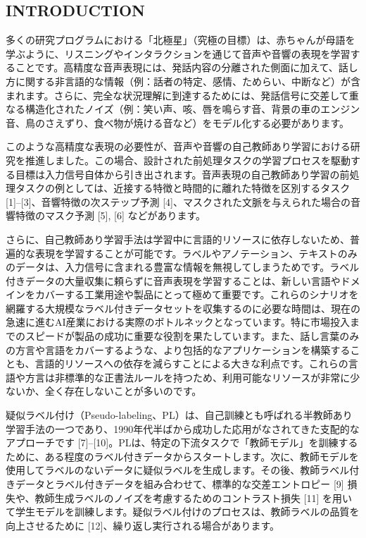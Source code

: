 \documentclass[]{ltjsarticle}
\begin{document}
\begin{multicols}{2}
\section{INTRODUCTION}
多くの研究プログラムにおける「北極星」（究極の目標）は、赤ちゃんが母語を学ぶように、リスニングやインタラクションを通じて音声や音響の表現を学習することです。高精度な音声表現には、発話内容の分離された側面に加えて、話し方に関する非言語的な情報（例：話者の特定、感情、ためらい、中断など）が含まれます。さらに、完全な状況理解に到達するためには、発話信号に交差して重なる構造化されたノイズ（例：笑い声、咳、唇を鳴らす音、背景の車のエンジン音、鳥のさえずり、食べ物が焼ける音など）をモデル化する必要があります。

このような高精度な表現の必要性が、音声や音響の自己教師あり学習における研究を推進しました。この場合、設計された前処理タスクの学習プロセスを駆動する目標は入力信号自体から引き出されます。音声表現の自己教師あり学習の前処理タスクの例としては、近接する特徴と時間的に離れた特徴を区別するタスク [1]–[3]、音響特徴の次ステップ予測 [4]、マスクされた文脈を与えられた場合の音響特徴のマスク予測 [5], [6] などがあります。

さらに、自己教師あり学習手法は学習中に言語的リソースに依存しないため、普遍的な表現を学習することが可能です。ラベルやアノテーション、テキストのみのデータは、入力信号に含まれる豊富な情報を無視してしまうためです。ラベル付きデータの大量収集に頼らずに音声表現を学習することは、新しい言語やドメインをカバーする工業用途や製品にとって極めて重要です。これらのシナリオを網羅する大規模なラベル付きデータセットを収集するのに必要な時間は、現在の急速に進むAI産業における実際のボトルネックとなっています。特に市場投入までのスピードが製品の成功に重要な役割を果たしています。また、話し言葉のみの方言や言語をカバーするような、より包括的なアプリケーションを構築することも、言語的リソースへの依存を減らすことによる大きな利点です。これらの言語や方言は非標準的な正書法ルールを持つため、利用可能なリソースが非常に少ないか、全く存在しないことが多いのです。

疑似ラベル付け（Pseudo-labeling、PL）は、自己訓練とも呼ばれる半教師あり学習手法の一つであり、1990年代半ばから成功した応用がなされてきた支配的なアプローチです [7]–[10]。PLは、特定の下流タスクで「教師モデル」を訓練するために、ある程度のラベル付きデータからスタートします。次に、教師モデルを使用してラベルのないデータに疑似ラベルを生成します。その後、教師ラベル付きデータとラベル付きデータを組み合わせて、標準的な交差エントロピー [9] 損失や、教師生成ラベルのノイズを考慮するためのコントラスト損失 [11] を用いて学生モデルを訓練します。疑似ラベル付けのプロセスは、教師ラベルの品質を向上させるために [12]、繰り返し実行される場合があります。
\end{multicols}
\end{document}
